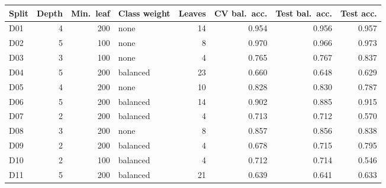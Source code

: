 \begin{tabular}{lrrlrrrr}
\hline
Split & Depth & Min.\ leaf & Class weight & Leaves & CV bal.\ acc. & Test bal.\ acc. & Test acc. \\
\hline
D01 & 4 & 200 & none & 14 & 0.954 & 0.956 & 0.957 \\
D02 & 5 & 100 & none & 8 & 0.970 & 0.966 & 0.973 \\
D03 & 3 & 100 & none & 4 & 0.765 & 0.767 & 0.837 \\
D04 & 5 & 200 & balanced & 23 & 0.660 & 0.648 & 0.629 \\
D05 & 4 & 200 & none & 10 & 0.828 & 0.830 & 0.787 \\
D06 & 5 & 200 & balanced & 14 & 0.902 & 0.885 & 0.915 \\
D07 & 2 & 200 & balanced & 4 & 0.713 & 0.712 & 0.570 \\
D08 & 3 & 200 & none & 8 & 0.857 & 0.856 & 0.838 \\
D09 & 2 & 200 & balanced & 4 & 0.678 & 0.715 & 0.795 \\
D10 & 2 & 100 & balanced & 4 & 0.712 & 0.714 & 0.546 \\
D11 & 5 & 200 & balanced & 21 & 0.639 & 0.641 & 0.633 \\
\hline
\end{tabular}
